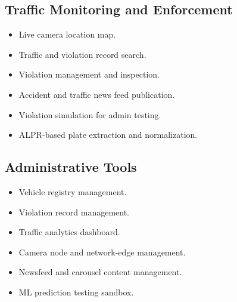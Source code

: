 \documentclass[12pt]{article}
\begin{document}
\subsection{Traffic Monitoring and Enforcement}
\begin{itemize}[leftmargin=*]
\item Live camera location map.
\item Traffic and violation record search.
\item Violation management and inspection.
\item Accident and traffic news feed publication.
\item Violation simulation for admin testing.
\item ALPR-based plate extraction and normalization.
\end{itemize}

\subsection{Administrative Tools}
\begin{itemize}[leftmargin=*]
\item Vehicle registry management.
\item Violation record management.
\item Traffic analytics dashboard.
\item Camera node and network-edge management.
\item Newsfeed and carousel content management.
\item ML prediction testing sandbox.
\end{itemize}
\end{document}
